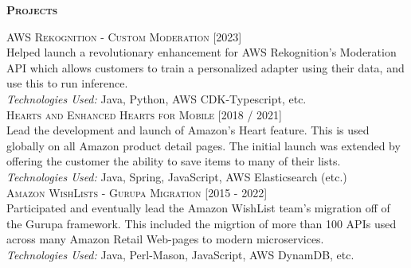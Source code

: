 \documentclass[letterpaper,12pt,final]{memoir}
\newcommand{\Sep}{\vspace{1.5em}}
\newcommand{\SmallSep}{\vspace{0.5em}}
\newcommand{\CVSection}[1]
	{\Large\textbf{\textsc{{#1}}}\par
	\SmallSep\normalsize\normalfont}
\newcommand{\CVItem}[1]
	{\textsc{\color{Plum} #1}}
\newcommand{\RightAlignedInlineText}[1]
{{\footnotesize \color{Plum}  \hfill [#1]}}
\begin{document}
\CVSection{Projects}
\CVItem{AWS Rekognition - Custom Moderation}  \RightAlignedInlineText{2023}\\
{\footnotesize Helped launch a revolutionary enhancement for AWS Rekognition's Moderation API which allows customers to train a personalized adapter using their data, and use this to run inference.\\
	\emph{Technologies Used:} Java, Python, AWS CDK-Typescript, etc. }%
\SmallSep\\
\CVItem{Hearts and Enhanced Hearts for Mobile} \RightAlignedInlineText{2018 / 2021}\\
{\footnotesize Lead the development and launch of Amazon's Heart feature. This is used globally  on all Amazon product detail pages. The initial launch was extended by offering the customer the ability to save items to many of their lists.\\\color{Black}
\emph{Technologies Used:} Java, Spring, JavaScript, AWS Elasticsearch (etc.)}%
\SmallSep\\
\CVItem{Amazon WishLists - Gurupa Migration} \RightAlignedInlineText{2015 - 2022}\\
{\footnotesize Participated and eventually lead the Amazon WishList team's migration off of the Gurupa framework. This included the migrtion of more than 100 APIs used across many Amazon Retail Web-pages to modern microservices.\\\color{Black}
	\emph{Technologies Used:} Java, Perl-Mason, JavaScript, AWS DynamDB, etc.}%
\SmallSep\\
\end{document}
